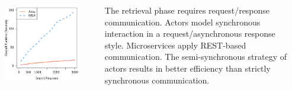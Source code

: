 \documentclass[final,hyperref={pdfpagelabels=true}]{beamer}
\begin{document}
\begin{frame}
\begin{columns}[t]
\begin{column}{.43\textwidth}
      \begin{columns}[t]
        \begin{column}{.46\textwidth}
          \begin{center}
          \includegraphics[width=1\textwidth]{graphics/eval-search-rtt-overall.pdf}
          \end{center}
        \end{column}
        \begin{column}{.08\textwidth}
        \end{column}
        \begin{column}{.46\textwidth}
          {\lmodern\justify
            \begin{justify}
            The retrieval phase requires request/response communication. Actors model synchronous interaction in a request/asynchronous response style. Microservices apply REST-based communication. The semi-synchronous strategy of actors results in better efficiency than strictly synchronous communication.  
            \end{justify}
          }
        \end{column}
      \end{columns}
    \end{column}
    \begin{column}{.04\textwidth}
      \end{column}
  \end{columns}

\end{frame}
\end{document}
